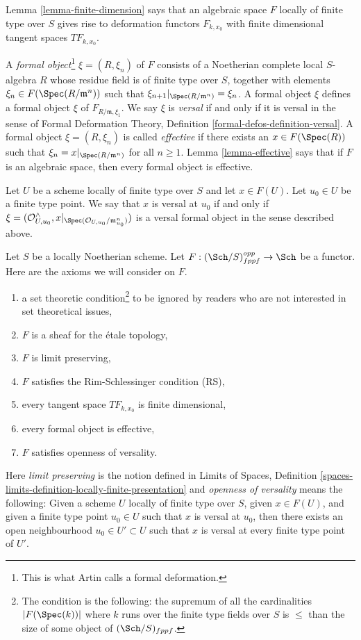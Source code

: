 \medskip\noindent
Lemma \ref{lemma-finite-dimension} says that an algebraic space $F$
locally of finite type over $S$ gives rise to deformation functors
$F_{k, x_0}$ with finite dimensional tangent spaces $TF_{k, x_0}$.

\medskip\noindent
A {\it formal object}\footnote{This is what Artin calls a formal deformation.}
$\xi = (R, \xi_n)$ of $F$ consists of a Noetherian
complete local $S$-algebra $R$ whose residue field is of finite type
over $S$, together with elements $\xi_n \in F(\Spec(R/\mathfrak m^n))$
such that $\xi_{n + 1}|_{\Spec(R/\mathfrak m^n)} = \xi_n$. A formal
object $\xi$ defines a formal object $\xi$ of $F_{R/\mathfrak m, \xi_1}$.
We say $\xi$ is {\it versal} if and only if it is versal in the sense of
Formal Deformation Theory, Definition \ref{formal-defos-definition-versal}.
A formal object $\xi = (R, \xi_n)$ is called {\it effective}
if there exists an $x \in F(\Spec(R))$ such that
$\xi_n = x|_{\Spec(R/\mathfrak m^n)}$ for all $n \geq 1$.
Lemma \ref{lemma-effective} says that if $F$ is an algebraic space,
then every formal object is effective.

\medskip\noindent
Let $U$ be a scheme locally of finite type over $S$ and let $x \in F(U)$.
Let $u_0 \in U$ be a finite type point. We say that $x$ is versal at $u_0$
if and only if
$\xi = (\mathcal{O}_{U, u_0}^\wedge,
x|_{\Spec(\mathcal{O}_{U, u_0}/\mathfrak m_{u_0}^n)})$
is a versal formal object in the sense described above.

\medskip\noindent
Let $S$ be a locally Noetherian scheme. Let
$F : (\Sch/S)_{fppf}^{opp} \to \Sch$ be a functor.
Here are the axioms we will consider on $F$.
\begin{enumerate}
\item[{[-1]}]  a set theoretic condition\footnote{The condition is the
following: the supremum of all the cardinalities
$|F(\Spec(k))|$ where $k$ runs over the finite
type fields over $S$ is $\leq$ than the size of some
object of $(\Sch/S)_{fppf}$.} to be ignored by
readers who are not interested in set theoretical issues,
\item[{[0]}] $F$ is a sheaf for the \'etale topology,
\item[{[1]}] $F$ is limit preserving,
\item[{[2]}] $F$ satisfies the Rim-Schlessinger condition (RS),
\item[{[3]}] every tangent space $TF_{k, x_0}$ is finite dimensional,
\item[{[4]}] every formal object is effective,
\item[{[5]}] $F$ satisfies openness of versality.
\end{enumerate}
Here {\it limit preserving} is the notion defined in
Limits of Spaces, Definition
\ref{spaces-limits-definition-locally-finite-presentation} and
{\it openness of versality} means the following: Given a scheme $U$
locally of finite type over $S$, given $x \in F(U)$, and given
a finite type point $u_0 \in U$ such that $x$ is versal at $u_0$,
then there exists an open neighbourhood $u_0 \in U' \subset U$
such that $x$ is versal at every finite type point of $U'$.






